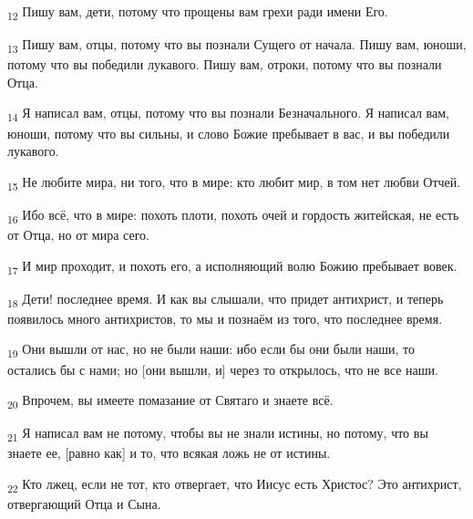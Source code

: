 \begin{tcolorbox}
\textsubscript{12} Пишу вам, дети, потому что прощены вам грехи ради имени Его.
\end{tcolorbox}
\begin{tcolorbox}
\textsubscript{13} Пишу вам, отцы, потому что вы познали Сущего от начала. Пишу вам, юноши, потому что вы победили лукавого. Пишу вам, отроки, потому что вы познали Отца.
\end{tcolorbox}
\begin{tcolorbox}
\textsubscript{14} Я написал вам, отцы, потому что вы познали Безначального. Я написал вам, юноши, потому что вы сильны, и слово Божие пребывает в вас, и вы победили лукавого.
\end{tcolorbox}
\begin{tcolorbox}
\textsubscript{15} Не любите мира, ни того, что в мире: кто любит мир, в том нет любви Отчей.
\end{tcolorbox}
\begin{tcolorbox}
\textsubscript{16} Ибо всё, что в мире: похоть плоти, похоть очей и гордость житейская, не есть от Отца, но от мира сего.
\end{tcolorbox}
\begin{tcolorbox}
\textsubscript{17} И мир проходит, и похоть его, а исполняющий волю Божию пребывает вовек.
\end{tcolorbox}
\begin{tcolorbox}
\textsubscript{18} Дети! последнее время. И как вы слышали, что придет антихрист, и теперь появилось много антихристов, то мы и познаём из того, что последнее время.
\end{tcolorbox}
\begin{tcolorbox}
\textsubscript{19} Они вышли от нас, но не были наши: ибо если бы они были наши, то остались бы с нами; но [они вышли, и] через то открылось, что не все наши.
\end{tcolorbox}
\begin{tcolorbox}
\textsubscript{20} Впрочем, вы имеете помазание от Святаго и знаете всё.
\end{tcolorbox}
\begin{tcolorbox}
\textsubscript{21} Я написал вам не потому, чтобы вы не знали истины, но потому, что вы знаете ее, [равно как] и то, что всякая ложь не от истины.
\end{tcolorbox}
\begin{tcolorbox}
\textsubscript{22} Кто лжец, если не тот, кто отвергает, что Иисус есть Христос? Это антихрист, отвергающий Отца и Сына.
\end{tcolorbox}
